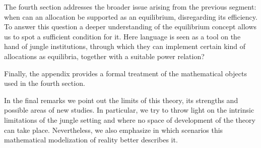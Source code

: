 \documentclass[12pt,a4paper]{article}
\numberwithin{theorem}{section}
\numberwithin{definition}{section}
\numberwithin{example}{section}
\numberwithin{exercise}{section}
\begin{document}
The fourth section addresses the broader issue arising from the previous segment: when can an allocation be supported as an equilibrium, disregarding its efficiency. To answer this question a deeper understanding of the equilibrium concept allows us to spot a sufficient condition for it. Here language is seen as a tool on the hand of jungle institutions, through which they can implement certain kind of allocations as equilibria, together with a suitable power relation?     


Finally, the appendix provides a formal treatment of the mathematical objects used in the fourth section. 

In the final remarks we point out the limits of this theory, its strengths and possible areas of new studies. In particular, we try to throw light on the intrinsic limitations of the jungle setting and where no space of development of the theory can take place. Nevertheless, we also emphasize in which scenarios this mathematical modelization of reality better describes it.





\end{document}

